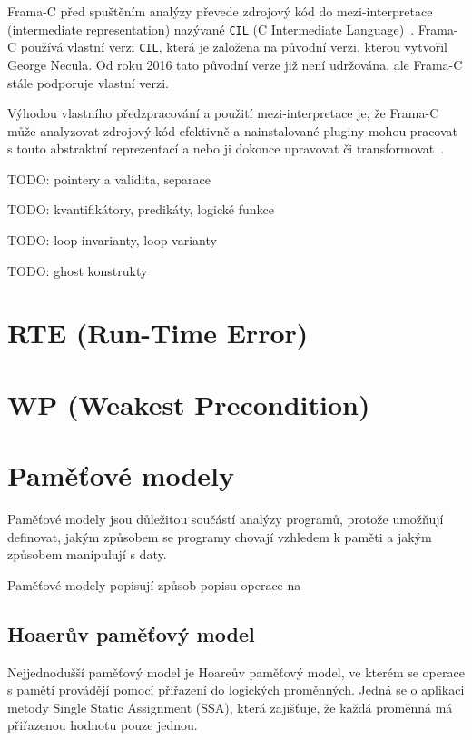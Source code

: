 Frama\mbox{-}C před spuštěním analýzy převede zdrojový kód do mezi-interpretace (intermediate representation)
nazývané \texttt{CIL} (C Intermediate Language)~\cite{Necula2002CIL}.
Frama\mbox{-}C používá vlastní verzi \texttt{CIL}, která je založena na původní verzi, kterou vytvořil George Necula.
Od roku 2016 tato původní verze již není udržována, ale Frama\mbox{-}C stále podporuje vlastní verzi.

Výhodou vlastního předzpracování a použití mezi-interpretace je,
že Frama\mbox{-}C může analyzovat zdrojový kód efektivně
a nainstalované pluginy mohou pracovat s touto abstraktní reprezentací
a nebo ji dokonce upravovat či transformovat~\cite{FCKernelMaroneze2024}.

TODO: pointery a validita, separace

TODO: kvantifikátory, predikáty, logické funkce

TODO: loop invarianty, loop varianty

TODO: ghost konstrukty


\section{RTE (Run-Time Error)}
\label{sec:frama-c-rte}


\section{WP (Weakest Precondition)}
\label{sec:frama-c-wp}


\section{Paměťové modely}
\label{sec:frama-c-mem}

Paměťové modely jsou důležitou součástí analýzy programů,
protože umožňují definovat, jakým způsobem se programy chovají
vzhledem k paměti a jakým způsobem manipulují s daty.

Paměťové modely popisují způsob popisu operace na

\subsection{Hoaerův paměťový model}
\label{subsec:hoaeruv-pametovy-model}

Nejjednodušší paměťový model je Hoareův paměťový model,
ve kterém se operace s pamětí provádějí pomocí přiřazení do logických proměnných.
Jedná se o aplikaci metody Single Static Assignment (SSA),
která zajišťuje, že každá proměnná má přiřazenou hodnotu pouze jednou.


